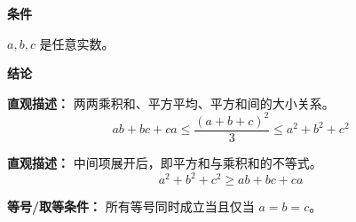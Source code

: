 \begin{statementbox}

\textbf{\textcolor{CStatement}{条件}}
\begin{description}[style=nextline, leftmargin=2.8em, labelsep=0.5em, itemsep=0.35em]
    \item[\textbf{\textcolor{CStatement}{条件 1（实数范围）：}}] $a, b, c$ 是任意实数。
\end{description}

\textbf{\textcolor{CStatement}{结论}}
\begin{description}[style=nextline, leftmargin=2.8em, labelsep=0.5em, itemsep=0.45em]
    \item[\textbf{\textcolor{CStatement}{结论一（不等式链）：}}]
    \textbf{\textcolor{CStatement}{直观描述：}} 两两乘积和、平方平均、平方和间的大小关系。
    \[
    ab + bc + ca \leq \frac{(a+b+c)^2}{3} \leq a^2 + b^2 + c^2
    \]

    \item[\textbf{\textcolor{CStatement}{推广结论（柯西特例）：}}]
    \textbf{\textcolor{CStatement}{直观描述：}} 中间项展开后，即平方和与乘积和的不等式。
    \[
    a^2+b^2+c^2 \ge ab+bc+ca
    \]
\end{description}

\textbf{\textcolor{CStatement}{等号/取等条件：}} 所有等号同时成立当且仅当 $a = b = c$。

\end{statementbox}

